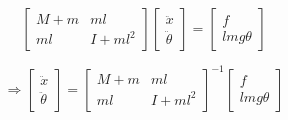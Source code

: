 \documentclass{article}
\begin{document}
\thispagestyle{empty}

$$
\begin{bmatrix}M+m & ml \\ ml & I+ml^2\end{bmatrix}\begin{bmatrix}\ddot{x}\\ \ddot{\theta}\end{bmatrix} = \begin{bmatrix}f\\ lmg\theta\end{bmatrix}
$$

$$
\Rightarrow\begin{bmatrix}\ddot{x}\\ \ddot{\theta}\end{bmatrix} = \begin{bmatrix}M+m & ml \\ ml & I+ml^2\end{bmatrix}^{-1}\begin{bmatrix}f\\ lmg\theta\end{bmatrix}
$$
\end{document}

